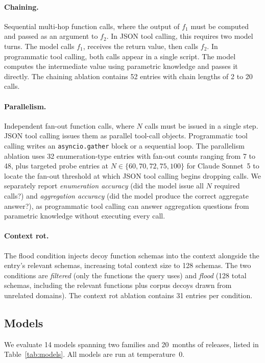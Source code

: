 \documentclass[11pt]{article}
\newcommand{\codemode}{programmatic tool calling}
\newcommand{\Codemode}{Programmatic tool calling}
\newcommand{\nmodels}{14}
\begin{document}
\paragraph{Chaining.}
Sequential multi-hop function calls, where the output of $f_1$ must be computed
and passed as an argument to $f_2$.
In JSON tool calling, this requires two model turns. The model calls $f_1$, receives the
return value, then calls $f_2$.
In \codemode{}, both calls appear in a single script. The model computes the
intermediate value using parametric knowledge and passes it directly.
The chaining ablation contains 52 entries with chain lengths of 2 to 20 calls.

\paragraph{Parallelism.}
Independent fan-out function calls, where $N$ calls must be issued in a single
step.
JSON tool calling issues them as parallel tool-call objects. \Codemode{} writes an
\texttt{asyncio.gather} block or a sequential loop.
The parallelism ablation uses 32 enumeration-type entries with fan-out counts ranging from 7 to 48,
plus targeted probe entries at $N \in \{60, 70, 72, 75, 100\}$ for Claude Sonnet~5 to locate
the fan-out threshold at which JSON tool calling begins dropping calls.
We separately report \textit{enumeration accuracy} (did the model issue all $N$
required calls?) and \textit{aggregation accuracy} (did the model produce the
correct aggregate answer?), as \codemode{} can answer aggregation questions from
parametric knowledge without executing every call.

\paragraph{Context rot.}
The flood condition injects decoy function schemas into the context alongside
the entry's relevant schemas, increasing total context size to 128 schemas.
The two conditions are \textit{filtered} (only the functions the query uses)
and \textit{flood} (128 total schemas, including the relevant functions plus
corpus decoys drawn from unrelated domains).
The context rot ablation contains 31 entries per condition.

\subsection{Models}

We evaluate \nmodels{} models spanning two families and 20~months of releases,
listed in Table~\ref{tab:models}.
All models are run at temperature~0.
\end{document}
